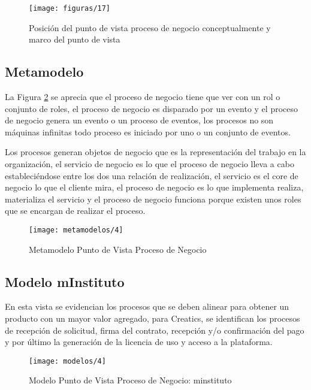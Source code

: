   \begin{figure}[H]
  	\centering
  	\texttt{[image: figuras/17]}
  	\captionsetup{width=.95\textwidth}
  	\caption{Posición del punto de vista proceso de negocio conceptualmente y marco del punto de vista \cite{ref9}}
  	\label{figura17}
  \end{figure}
  
  \subsection{Metamodelo}
  La Figura \ref{metamodelo4} se aprecia que el proceso de negocio tiene que ver con un rol o conjunto de roles, el proceso de negocio es disparado por un evento y el proceso de negocio genera un evento o un proceso de eventos, los procesos no son máquinas infinitas todo proceso es
  iniciado por uno o un conjunto de eventos.
  
  Los procesos generan objetos de negocio que es la representación del trabajo en la organización,  el servicio de negocio es lo que el proceso de negocio lleva a cabo estableciéndose entre los dos una relación de realización, el servicio es el core de negocio lo que el cliente mira, el proceso de negocio es lo que implementa realiza, materializa el servicio y el proceso de negocio funciona porque existen unos roles que se encargan de realizar el proceso. \cite{ref9}
  
  \begin{figure}[H]
  	\centering
  	\texttt{[image: metamodelos/4]}
  	\captionsetup{width=.95\textwidth}
  	\caption{Metamodelo Punto de Vista Proceso de Negocio \cite{ref9}}
  	\label{metamodelo4}
  \end{figure}
  
  \subsection{Modelo mInstituto}
  En esta vista se evidencian los procesos que se deben alinear para obtener un producto con un mayor valor agregado, para Creatics, se identifican los procesos de recepción de solicitud, firma del contrato, recepción y/o confirmación del pago y por último la generación de la licencia de uso y acceso a la plataforma.
  
  \begin{figure}[H]
  	\centering
  	\texttt{[image: modelos/4]}
  	\captionsetup{width=.95\textwidth}
  	\caption{Modelo Punto de Vista Proceso de Negocio: minstituto}
  	\label{modelo4}
  \end{figure}
  
